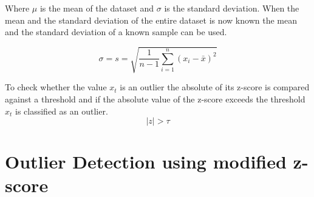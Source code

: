 Where $\mu$ is the mean of the dataset and $\sigma$ is the standard deviation. When the mean and the standard deviation of the entire dataset is now known the mean and the standard deviation of a known sample can be used.
\cite{DetectionSpatialOutlier, teschlSpezielleStetigeVerteilungen2014, rousseeuwAnomalyDetectionRobust2018}

\begin{equation*}
  \sigma = s = \sqrt{\frac{1}{n-1}\sum^n_{i=1}{(x_i - \bar{x})^2}}
\end{equation*}
\cite{teschlSpezielleStetigeVerteilungen2014, rousseeuwAnomalyDetectionRobust2018}
\par
To check whether the value $x_t$ is an outlier the absolute of its z-score is compared against a threshold and if the absolute value of the z-score exceeds the threshold $x_t$ is classified as an outlier.
\begin{equation*}
  |z| > \tau
\end{equation*}
\section{Outlier Detection using modified z-score}
\cite{baeOutlierDetectionSmoothing2019}


